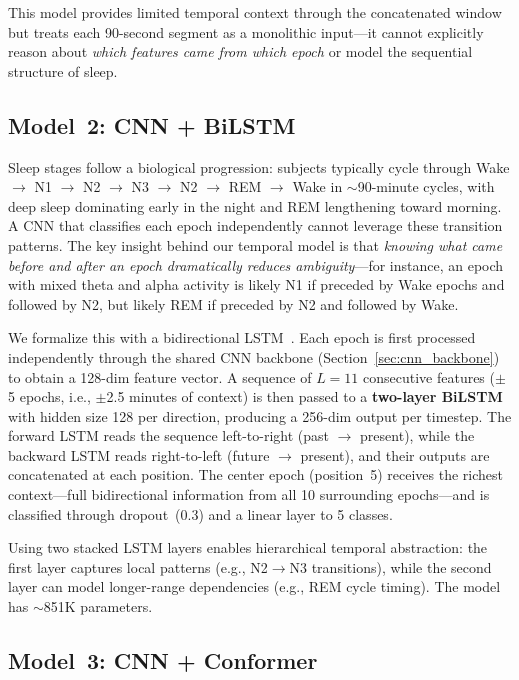 \documentclass[final]{article}
\begin{document}
This model provides limited temporal context through the concatenated window but treats each 90-second segment as a monolithic input---it cannot explicitly reason about \emph{which features came from which epoch} or model the sequential structure of sleep.

\subsection{Model~2: CNN + BiLSTM}
\label{sec:bilstm}

Sleep stages follow a biological progression: subjects typically cycle through Wake $\to$ N1 $\to$ N2 $\to$ N3 $\to$ N2 $\to$ REM $\to$ Wake in $\sim$90-minute cycles, with deep sleep dominating early in the night and REM lengthening toward morning. A CNN that classifies each epoch independently cannot leverage these transition patterns. The key insight behind our temporal model is that \emph{knowing what came before and after an epoch dramatically reduces ambiguity}---for instance, an epoch with mixed theta and alpha activity is likely N1 if preceded by Wake epochs and followed by N2, but likely REM if preceded by N2 and followed by Wake.

We formalize this with a bidirectional LSTM~\cite{Hochreiter1997}. Each epoch is first processed independently through the shared CNN backbone (Section~\ref{sec:cnn_backbone}) to obtain a 128-dim feature vector. A sequence of $L = 11$ consecutive features ($\pm$5 epochs, i.e., $\pm$2.5 minutes of context) is then passed to a \textbf{two-layer BiLSTM} with hidden size 128 per direction, producing a 256-dim output per timestep. The forward LSTM reads the sequence left-to-right (past $\to$ present), while the backward LSTM reads right-to-left (future $\to$ present), and their outputs are concatenated at each position. The center epoch (position~5) receives the richest context---full bidirectional information from all 10 surrounding epochs---and is classified through dropout~(0.3) and a linear layer to 5 classes.

Using two stacked LSTM layers enables hierarchical temporal abstraction: the first layer captures local patterns (e.g., N2$\to$N3 transitions), while the second layer can model longer-range dependencies (e.g., REM cycle timing). The model has $\sim$851K parameters.

\subsection{Model~3: CNN + Conformer}
\label{sec:conformer}
\end{document}
